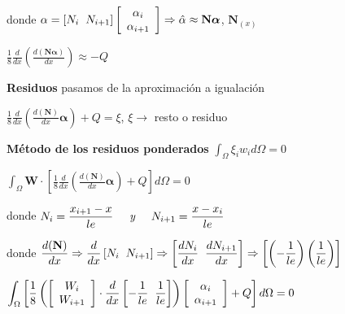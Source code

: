 \documentclass[12pt]{report}
\begin{document}
        donde $\displaystyle \alpha=[N_i \hspace{0.2cm} N_{i+1}]\left[\begin{array}{c} \alpha_i \\ \alpha_{i+1} \end{array}\right] \Rightarrow \hat{\alpha} \approx \textbf{N} \bm{\alpha}$, \hspace{0.7cm} $\displaystyle \textbf{N}_{(x)}$
        
        \begin{center}
            $\displaystyle \frac{1}{8}\frac{d}{dx}\left(\frac{d(\textbf{N}\bm{\alpha})}{dx}\right) \approx -Q$
        \end{center}

        \textbf{Residuos} pasamos de la aproximación a igualación
        \begin{center}
            $\displaystyle \frac{1}{8}\frac{d}{dx}\left(\frac{d(\textbf{N})}{dx} \bm{\alpha} \right) + Q = \xi$, \hspace{1cm} $\xi \rightarrow$ resto o residuo
        \end{center}

        \textbf{Método de los residuos ponderados} $\int_{\Omega} \xi_i w_i d\Omega = 0$       
        \begin{center}
            $\displaystyle \int_{\Omega} \textbf{W} \cdot \left[\frac{1}{8} \frac{d}{dx} \left( \frac{d(\textbf{N})}{dx} \bm{\alpha}\right) + Q  \right] d\Omega = 0$   
        \end{center}

        donde $\displaystyle N_i = \frac{x_{i+1}-x}{le} \hspace{0.5cm} \textit{y} \hspace{0.5cm} N_{i+1} = \frac{x-x_i}{le}$

        donde $\displaystyle \frac{d(\textbf{N})}{dx} \Rightarrow \frac{d}{dx} \left[ N_i \hspace{0.2cm} N_{i+1}\right] \Rightarrow  \left[ \frac{d N_i}{dx} \hspace{0.2cm} \frac{d N_{i+1}}{dx}\right] \Rightarrow \left[ \left( -\frac{1}{le} \right) \left( \frac{1}{le} \right) \right]$

        \begin{center}
            $\displaystyle \int_\Omega \left[ \frac{1}{8}\left(
                \left[ \begin{array}{c} W_{i} \\ W_{i+1} \end{array} \right]
                \cdot \frac{d}{dx} 
                \left[ -\frac{1}{le} \hspace{0.2cm} \frac{1}{le} \right]
            \right) \left[ \begin{array}{c} \alpha_{i} \\ \alpha_{i+1} \end{array}\right]+ Q \right] d\Omega= 0$
        \end{center}
\end{document}
